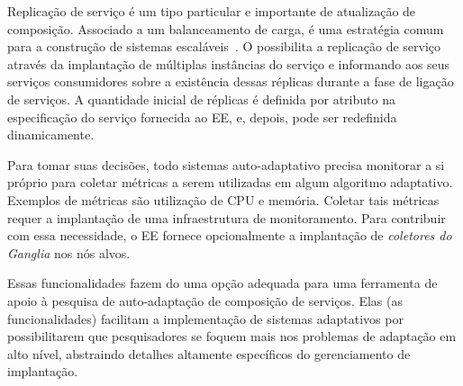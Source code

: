 \begin{description}
Replicação de serviço é um tipo particular e importante de atualização de composição.
Associado a um balanceamento de carga, é uma estratégia comum para
a construção de sistemas escaláveis~\cite{Amazon2012Practices}.
O \ee possibilita a replicação de serviço através da implantação de
múltiplas instâncias do serviço e informando aos seus serviços consumidores
sobre a existência dessas réplicas durante a fase de ligação de serviços.
A quantidade inicial de réplicas é definida por atributo na especificação
do serviço fornecida ao EE, e, depois, pode ser redefinida dinamicamente.

Para tomar suas decisões, todo sistemas auto-adaptativo precisa monitorar
a si próprio para coletar métricas a serem utilizadas em algum algoritmo adaptativo.
Exemplos de métricas são utilização de CPU e memória.
Coletar tais métricas requer a implantação de uma infraestrutura de monitoramento.
Para contribuir com essa necessidade, o EE fornece opcionalmente a implantação
de \emph{coletores do Ganglia} nos nós alvos.

\end{description}

Essas funcionalidades fazem do \ee uma opção adequada para uma ferramenta de apoio 
à pesquisa de auto-adaptação de composição de serviços.
Elas (as funcionalidades) facilitam a implementação de sistemas adaptativos
por possibilitarem que pesquisadores se foquem mais nos problemas de adaptação em
alto nível, abstraindo detalhes altamente específicos do gerenciamento de implantação.
